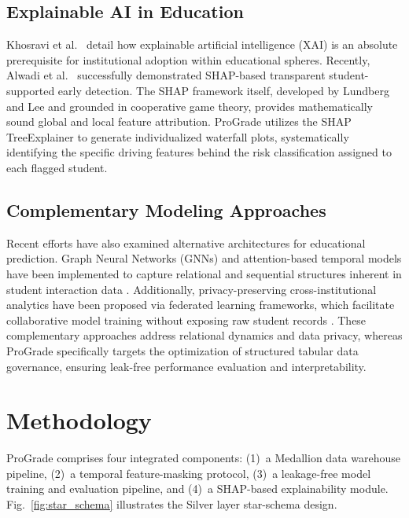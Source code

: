 \documentclass[conference,a4paper]{IEEEtran}
\begin{document}
\subsection{Explainable AI in Education}
Khosravi et al.\ \cite{khosravi2022xaiedu} detail how explainable artificial intelligence (XAI) is an absolute prerequisite for institutional adoption within educational spheres. Recently, Alwadi et al.\ \cite{nature2025xai} successfully demonstrated SHAP-based transparent student-supported early detection. The SHAP framework itself, developed by Lundberg and Lee \cite{lundberg2017shap} and grounded in cooperative game theory, provides mathematically sound global and local feature attribution. ProGrade utilizes the SHAP TreeExplainer to generate individualized waterfall plots, systematically identifying the specific driving features behind the risk classification assigned to each flagged student.

\subsection{Complementary Modeling Approaches}
Recent efforts have also examined alternative architectures for educational prediction. Graph Neural Networks (GNNs) and attention-based temporal models have been implemented to capture relational and sequential structures inherent in student interaction data \cite{chen2022deep}. Additionally, privacy-preserving cross-institutional analytics have been proposed via federated learning frameworks, which facilitate collaborative model training without exposing raw student records \cite{gardner2023crossinstitutional}. These complementary approaches address relational dynamics and data privacy, whereas ProGrade specifically targets the optimization of structured tabular data governance, ensuring leak-free performance evaluation and interpretability.

\section{Methodology}\label{sec:method}

ProGrade comprises four integrated components: (1)~a Medallion data warehouse pipeline, (2)~a temporal feature-masking protocol, (3)~a leakage-free model training and evaluation pipeline, and (4)~a SHAP-based explainability module. Fig.~\ref{fig:star_schema} illustrates the Silver layer star-schema design.
\end{document}
